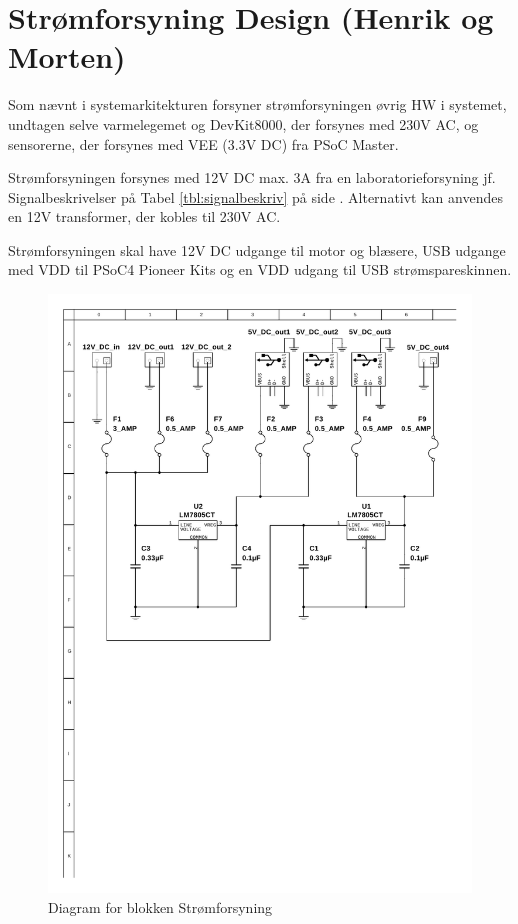 \section{Strømforsyning Design (Henrik og Morten)}

Som nævnt i systemarkitekturen forsyner strømforsyningen øvrig HW i systemet, undtagen selve varmelegemet og DevKit8000, der forsynes med 230V AC, og sensorerne, der forsynes med VEE (3.3V DC) fra PSoC Master.

Strømforsyningen forsynes med 12V DC max. 3A fra en laboratorieforsyning jf. Signalbeskrivelser på Tabel \ref{tbl:signalbeskriv} på side \pageref{tbl:signalbeskriv}. 
Alternativt kan anvendes en 12V transformer, der kobles til 230V AC. 

Strømforsyningen skal have 12V DC udgange til motor og blæsere, USB udgange med VDD til PSoC4 Pioneer Kits og en VDD udgang til USB strømspareskinnen.

\begin{figure}[h]
\centering 
\includegraphics[width={\textwidth}, trim=50 350 30 40, clip=true] {../fig/multisim_stroemforsyning.pdf}
\caption{Diagram for blokken Strømforsyning}
\label{fig:multisim_stroemforsyning}
\end{figure}

